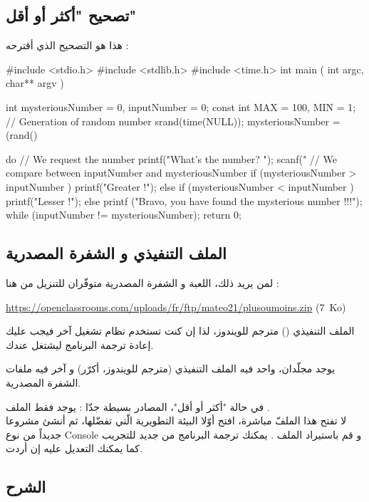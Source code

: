 \subsection{تصحيح "أكثر أو أقل"}

 هذا هو التصحيح الذي أقترحه :
 
\begin{Csource}
#include <stdio.h>
#include <stdlib.h>
#include <time.h>
int main ( int argc, char** argv )
{
	int mysteriousNumber = 0, inputNumber = 0;
	const int MAX = 100, MIN = 1;
	// Generation of random number
	srand(time(NULL));
	mysteriousNumber = (rand() %
	
	do
	{
		// We request the number
		printf("What's the number? ");
		scanf("%
		// We compare between inputNumber and mysteriousNumber
		if (mysteriousNumber > inputNumber )
		printf("Greater !\n\n");
		else if (mysteriousNumber < inputNumber )
		printf("Lesser !\n\n");
		else
		printf ("Bravo, you have found the mysterious number !!!\n\n");
	} while (inputNumber != mysteriousNumber);
	return 0;
}
\end{Csource}

\subsection{الملف التنفيذي و الشفرة المصدرية}

 لمن يريد ذلك، اللعبة و الشفرة المصدرية متوفّران للتنزيل من هنا :

\textenglish{\url{https://openclassrooms.com/uploads/fr/ftp/mateo21/plusoumoins.zip} \mbox{(7 Ko)}}

\begin{information}
الملف التنفيذي 
()
مترجم للويندوز، لذا إن كنت تستخدم نظام تشغيل آخر فيجب عليك إعادة ترجمة البرنامج ليشتغل عندك.
\end{information}

يوجد مجلّدان، واحد فيه الملف التنفيذي (مترجم للويندوز، أكرّر) و آخر فيه ملفات الشفرة المصدرية.

في حالة "أكثر أو أقل"، المصادر بسيطة جدّا : يوجد فقط الملف
.\\
لا تفتح هذا الملفّ مباشرة، افتح أوّلا البيئة التطويرية الّتي تفضّلها، ثم أنشئ مشروعا جديداً من نوع 
\textenglish{Console}
و قم باستيراد الملف 
.
يمكنك ترجمة البرنامج من جديد للتجريب كما يمكنك التعديل عليه إن أردت.

\subsection{الشرح}

